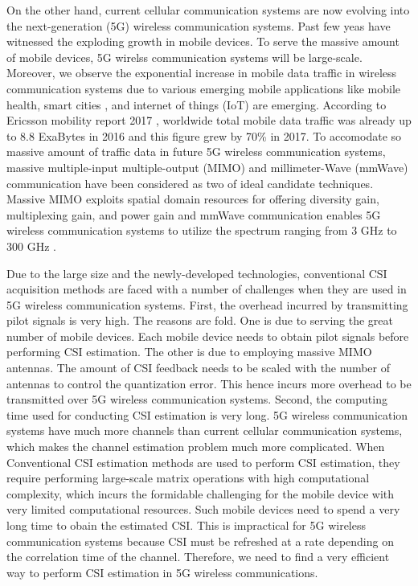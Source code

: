 \documentclass[10pt,journal,cspaper,compsoc]{IEEEtran}
\begin{document}
On the other hand, current cellular communication systems are now evolving into the next-generation (5G) wireless communication systems. Past few yeas have witnessed the exploding growth in mobile devices. To serve the massive amount of mobile devices, 5G wirelss communication systems will be large-scale. Moreover, we observe the exponential increase in mobile data traffic in wireless communication systems due to various emerging mobile applications like mobile health\cite{IRHI17}, smart cities \cite{KAF17}, and internet of things (IoT) \cite{MTC17} are emerging. According to Ericsson mobility report 2017 \cite{Ericsson17}, worldwide total mobile data traffic was already up to 8.8 ExaBytes in 2016 and this figure grew by 70\% in 2017. To accomodate so massive amount of traffic data in future 5G wireless communication systems, massive multiple-input multiple-output (MIMO) and millimeter-Wave (mmWave) communication have been considered as two of ideal candidate techniques. Massive MIMO exploits spatial domain resources for offering diversity gain, multiplexing gain, and power gain \cite{} and mmWave communication enables 5G wireless communication systems to utilize the spectrum ranging from 3 GHz to 300 GHz \cite{GDMW15}.

Due to the large size and the newly-developed technologies, conventional CSI acquisition methods are faced with a number of challenges when they are used in 5G wireless communication systems. First, the overhead incurred by transmitting pilot signals is very high. The reasons are fold. One is due to serving the great number of mobile devices. Each mobile device needs to obtain pilot signals before performing CSI estimation. The other is due to employing massive MIMO antennas. The amount of CSI feedback needs to be scaled with the number of antennas to control the quantization error. This hence incurs more overhead to be transmitted over 5G wireless communication systems. Second, the computing time used for conducting CSI estimation is very long. 5G wireless communication systems have much more channels than current cellular communication systems, which makes the channel estimation problem much more complicated. When Conventional CSI estimation methods are used to perform CSI estimation, they require performing large-scale matrix operations with high computational complexity, which incurs the formidable challenging for the mobile device with very limited computational resources. Such mobile devices need to spend a very long time to obain the estimated CSI. This is impractical for 5G wireless communication systems because CSI must be refreshed at a rate depending on the correlation time of the channel.
Therefore, we need to find a very efficient way to perform CSI estimation in 5G wireless communications.
\end{document}
